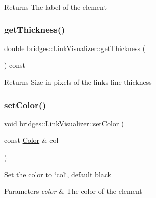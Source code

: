 \begin{DoxyReturn}{Returns}
The label of the element 
\end{DoxyReturn}
\mbox{\label{classbridges_1_1_link_visualizer_ae08a5f5fc9e83ea3b3d4ebebc245d3b4}} 
\subsubsection{\texorpdfstring{getThickness()}{getThickness()}}
{\footnotesize\ttfamily double bridges\+::\+Link\+Visualizer\+::get\+Thickness (\begin{DoxyParamCaption}{ }\end{DoxyParamCaption}) const\hspace{0.3cm}{\ttfamily [inline]}}

\begin{DoxyReturn}{Returns}
Size in pixels of the link\textquotesingle{}s line thickness 
\end{DoxyReturn}
\mbox{\label{classbridges_1_1_link_visualizer_adedc1f2b7d5d562b115ef9d8ae19fa73}} 
\subsubsection{\texorpdfstring{setColor()}{setColor()}\hspace{0.1cm}{\footnotesize\ttfamily [1/2]}}
{\footnotesize\ttfamily void bridges\+::\+Link\+Visualizer\+::set\+Color (\begin{DoxyParamCaption}\item[{const \mbox{\hyperlink{classbridges_1_1_color}{Color}} \&}]{col }\end{DoxyParamCaption})\hspace{0.3cm}{\ttfamily [inline]}}

Set the color to \char`\"{}col\char`\"{}, default black


\begin{DoxyParams}{Parameters}
{\em color} & The color of the element \\
\hline
\end{DoxyParams}
\mbox{\label{classbridges_1_1_link_visualizer_ae9901d2bb4fab91af73723bfbbbcc9b4}} 
